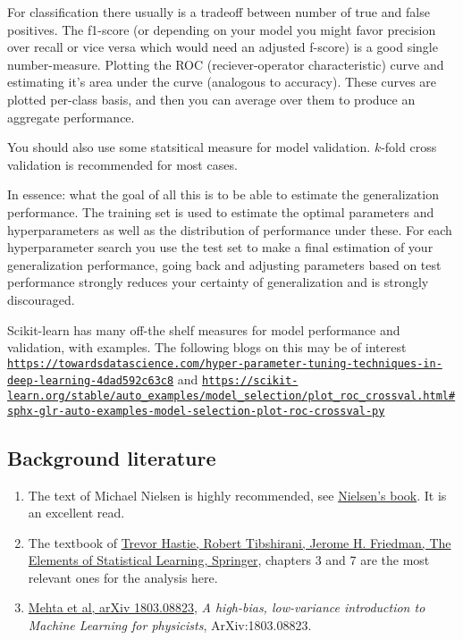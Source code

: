 \documentclass[%
oneside,                 %
final,                   %
10pt]{article}
\begin{document}
For classification there usually is a tradeoff between number of true
and false positives. The f1-score (or depending on your model you
might favor precision over recall or vice versa which would need an
adjusted f-score) is a good single number-measure. Plotting the ROC
(reciever-operator characteristic) curve and estimating it's area
under the curve (analogous to accuracy). These curves are plotted
per-class basis, and then you can average over them to produce an
aggregate performance.

You should also use some statsitical measure for model
validation. $k$-fold cross validation is recommended for most cases.

In essence: what the goal of all this is to be able to estimate the
generalization performance. The training set is used to estimate the
optimal parameters and hyperparameters as well as the distribution of
performance under these. For each hyperparameter search you use the
test set to make a final estimation of your generalization
performance, going back and adjusting parameters based on test
performance strongly reduces your certainty of generalization and is
strongly discouraged.

Scikit-learn has many off-the shelf measures for model performance and validation, with examples.  The following blogs on this may be of interest
\href{{https://towardsdatascience.com/hyper-parameter-tuning-techniques-in-deep-learning-4dad592c63c8}}{\nolinkurl{https://towardsdatascience.com/hyper-parameter-tuning-techniques-in-deep-learning-4dad592c63c8}} and 
\href{{https://scikit-learn.org/stable/auto_examples/model_selection/plot_roc_crossval.html#sphx-glr-auto-examples-model-selection-plot-roc-crossval-py}}{\nolinkurl{https://scikit-learn.org/stable/auto_examples/model_selection/plot_roc_crossval.html\#sphx-glr-auto-examples-model-selection-plot-roc-crossval-py}}



\subsection{Background literature}

\begin{enumerate}
\item The text of Michael Nielsen is highly recommended, see \href{{http://neuralnetworksanddeeplearning.com/}}{Nielsen's book}. It is an excellent read.

\item The textbook of \href{{https://www.springer.com/gp/book/9780387848570}}{Trevor Hastie, Robert Tibshirani, Jerome H. Friedman, The Elements of Statistical Learning, Springer}, chapters 3 and 7 are the most relevant ones for the analysis here. 

\item \href{{https://arxiv.org/abs/1803.08823}}{Mehta et al, arXiv 1803.08823}, \emph{A high-bias, low-variance introduction to Machine Learning for physicists}, ArXiv:1803.08823.
\end{enumerate}
\end{document}
